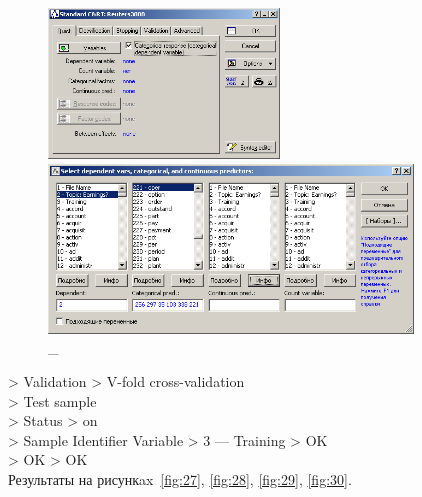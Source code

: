\begin{figure}[!h]
  \centering

  \begin{minipage}{0.29\textwidth}
    \centering

    \includegraphics[height=4cm]
    {inc/25.PNG}

    \caption{\_}

    \label{fig:25}
  \end{minipage}
  \begin{minipage}{0.69\textwidth}
    \centering

    \includegraphics[height=4.5cm]
    {inc/26.PNG}

    \caption{\_}

    \label{fig:26}
  \end{minipage}
\end{figure}

> Validation > V-fold cross-validation \\
> Test sample \\
> Status > on \\
> Sample Identifier Variable > 3 — Training > OK \\
> OK > OK \\

Результаты на рисункax~\ref{fig:27}, \ref{fig:28}, \ref{fig:29}, \ref{fig:30}.

